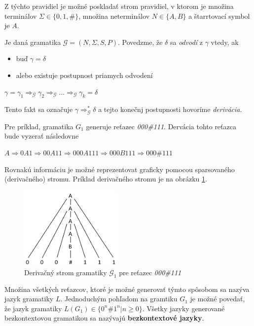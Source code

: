 Z týchto pravidiel je možné poskladať strom pravidiel, v ktorom je množina terminálov $\Sigma \in \{0,1,\#\}$, množina neterminálov $N \in \{A, B\}$ a štarrtovací symbol je $A$. 

\begin{definice}
Je daná gramatika $\mathcal{G} = (N, \Sigma , S, P)$. Povedzme, že $\delta$ sa \textit{odvodí} z $\gamma$ vtedy, ak
\begin{itemize}
\item buď $\gamma = \delta$
\item alebo existuje postupnost priamych odvodení
\end{itemize}
\begin{center}
$\gamma = \gamma_1 \Rightarrow_\mathcal{G} \gamma_2 \Rightarrow_\mathcal{G} ... \Rightarrow_\mathcal{G} \gamma_k = \delta$
\end{center}
Tento fakt sa označuje $\gamma\Rightarrow_\mathcal{G}^*\delta$ a tejto konečnj postupnosti hovoríme \textit{derivácia}. \cite{demlova:gramatiky}
\end{definice}

Pre príklad, gramatika $G_1$ generuje  reťazec \textit{000\#111}. Dervácia tohto reťazca bude vyzerať následovne
\begin{center}
$A \Rightarrow 0A1 \Rightarrow 00A11 \Rightarrow 000A111 \Rightarrow 000B111 \Rightarrow 000\#111$
\end{center}

Rovnakú informáciu je možné reprezentovat graficky pomocou sparsovaného (derivačného) stromu. Príklad derivačného stromu je na obrázku \ref{fig:derivacni_strom}. 

\begin{figure}[H]
\begin{center}
\includegraphics[width=5cm]{figures/derivacni_strom.PNG}
\caption{Derivačný strom gramatiky $\mathcal{G}_1$ pre reťazec \textit{000\#111}}
\label{fig:derivacni_strom}
\end{center}
\end{figure}

Množina všetkých reťazcov, ktoré je možné generovať týmto spôsobom sa nazýva jazyk gramatiky $L$. Jednoduchým pohľadom na gramtiku $G_1$ je možné povedať, že jazyk gramatiky $L(G_1) \in \{0^n\#1^n | n \geq 0\}$. Všetky jazyky generované bezkontextovou gramatikou sa nazývajú \textbf{bezkontextové jazyky}.

